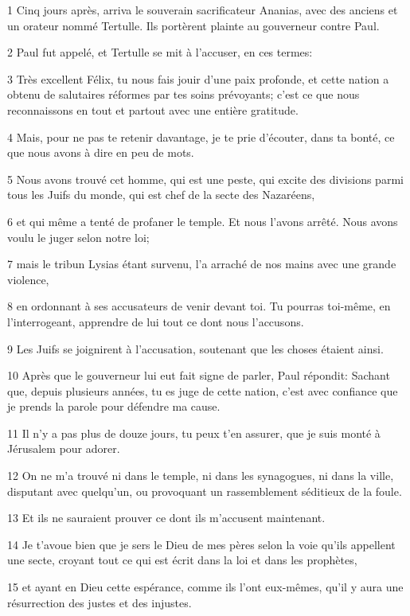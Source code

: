 \par 1 Cinq jours après, arriva le souverain sacrificateur Ananias, avec des anciens et un orateur nommé Tertulle. Ils portèrent plainte au gouverneur contre Paul.
\par 2 Paul fut appelé, et Tertulle se mit à l'accuser, en ces termes:
\par 3 Très excellent Félix, tu nous fais jouir d'une paix profonde, et cette nation a obtenu de salutaires réformes par tes soins prévoyants; c'est ce que nous reconnaissons en tout et partout avec une entière gratitude.
\par 4 Mais, pour ne pas te retenir davantage, je te prie d'écouter, dans ta bonté, ce que nous avons à dire en peu de mots.
\par 5 Nous avons trouvé cet homme, qui est une peste, qui excite des divisions parmi tous les Juifs du monde, qui est chef de la secte des Nazaréens,
\par 6 et qui même a tenté de profaner le temple. Et nous l'avons arrêté. Nous avons voulu le juger selon notre loi;
\par 7 mais le tribun Lysias étant survenu, l'a arraché de nos mains avec une grande violence,
\par 8 en ordonnant à ses accusateurs de venir devant toi. Tu pourras toi-même, en l'interrogeant, apprendre de lui tout ce dont nous l'accusons.
\par 9 Les Juifs se joignirent à l'accusation, soutenant que les choses étaient ainsi.
\par 10 Après que le gouverneur lui eut fait signe de parler, Paul répondit: Sachant que, depuis plusieurs années, tu es juge de cette nation, c'est avec confiance que je prends la parole pour défendre ma cause.
\par 11 Il n'y a pas plus de douze jours, tu peux t'en assurer, que je suis monté à Jérusalem pour adorer.
\par 12 On ne m'a trouvé ni dans le temple, ni dans les synagogues, ni dans la ville, disputant avec quelqu'un, ou provoquant un rassemblement séditieux de la foule.
\par 13 Et ils ne sauraient prouver ce dont ils m'accusent maintenant.
\par 14 Je t'avoue bien que je sers le Dieu de mes pères selon la voie qu'ils appellent une secte, croyant tout ce qui est écrit dans la loi et dans les prophètes,
\par 15 et ayant en Dieu cette espérance, comme ils l'ont eux-mêmes, qu'il y aura une résurrection des justes et des injustes.
